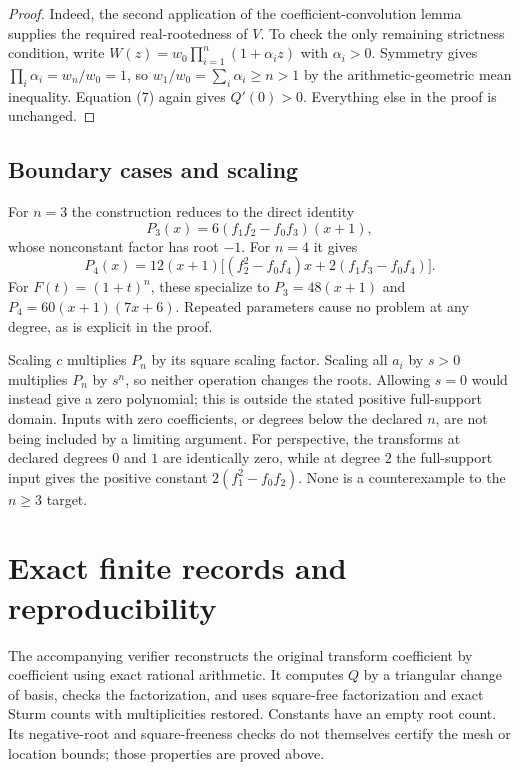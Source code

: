 \documentclass[11pt,a4paper]{article}
\begin{document}
\begin{proof}Indeed, the second application of the coefficient-convolution lemma supplies the required real-rootedness of $V$. To check the only remaining strictness condition, write $W(z)=w_0\prod_{i=1}^n(1+\alpha_i z)$ with $\alpha_i>0$. Symmetry gives $\prod_i\alpha_i=w_n/w_0=1$, so $w_1/w_0=\sum_i\alpha_i\geq n>1$ by the arithmetic-geometric mean inequality. Equation (7) again gives $Q'(0)>0$. Everything else in the proof is unchanged.

\end{proof}

\subsection*{Boundary cases and scaling}

For \(n=3\) the construction reduces to the direct identity \[
 P_3(x)=6(f_1f_2-f_0f_3)(x+1),
\] whose nonconstant factor has root \(-1\). For \(n=4\) it gives \[
 P_4(x)=12(x+1)
 \big[(f_2^2-f_0f_4)x+2(f_1f_3-f_0f_4)\big].
\] For \(F(t)=(1+t)^n\), these specialize to \(P_3=48(x+1)\) and \(P_4=60(x+1)(7x+6)\). Repeated parameters cause no problem at any degree, as is explicit in the proof.

Scaling \(c\) multiplies \(P_n\) by its square scaling factor. Scaling all \(a_i\) by \(s>0\) multiplies \(P_n\) by \(s^n\), so neither operation changes the roots. Allowing \(s=0\) would instead give a zero polynomial; this is outside the stated positive full-support domain. Inputs with zero coefficients, or degrees below the declared \(n\), are not being included by a limiting argument. For perspective, the transforms at declared degrees \(0\) and \(1\) are identically zero, while at degree \(2\) the full-support input gives the positive constant \(2(f_1^2-f_0f_2)\). None is a counterexample to the \(n\geq3\) target.

\section{Exact finite records and reproducibility}

The accompanying verifier reconstructs the original transform coefficient by coefficient using exact rational arithmetic. It computes \(Q\) by a triangular change of basis, checks the factorization, and uses square-free factorization and exact Sturm counts with multiplicities restored. Constants have an empty root count. Its negative-root and square-freeness checks do not themselves certify the mesh or location bounds; those properties are proved above.
\end{document}
